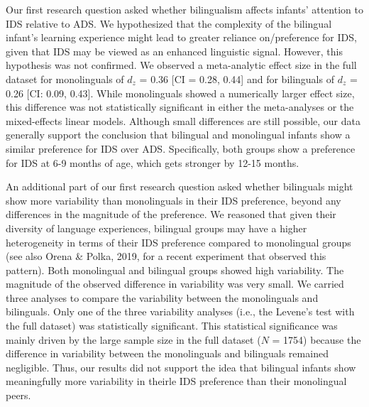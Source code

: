 \documentclass[,man,floatsintext]{apa6}
\begin{document}
Our first research question asked whether bilingualism affects infants' attention to IDS relative to ADS. We hypothesized that the complexity of the bilingual infant's learning experience might lead to greater reliance on/preference for IDS, given that IDS may be viewed as an enhanced linguistic signal. However, this hypothesis was not confirmed. We observed a meta-analytic effect size in the full dataset for monolinguals of \(d_z\) = 0.36 {[}CI = 0.28, 0.44{]} and for bilinguals of \(d_z\) = 0.26 {[}CI: 0.09, 0.43{]}. While monolinguals showed a numerically larger effect size, this difference was not statistically significant in either the meta-analyses or the mixed-effects linear models. Although small differences are still possible, our data generally support the conclusion that bilingual and monolingual infants show a similar preference for IDS over ADS. Specifically, both groups show a preference for IDS at 6-9 months of age, which gets stronger by 12-15 months.

An additional part of our first research question asked whether bilinguals might show more variability than monolinguals in their IDS preference, beyond any differences in the magnitude of the preference. We reasoned that given their diversity of language experiences, bilingual groups may have a higher heterogeneity in terms of their IDS preference compared to monolingual groups (see also Orena \& Polka, 2019, for a recent experiment that observed this pattern). Both monolingual and bilingual groups showed high variability. The magnitude of the observed difference in variability was very small. We carried three analyses to compare the variability between the monolinguals and bilinguals. Only one of the three variability analyses (i.e., the Levene's test with the full dataset) was statistically significant. This statistical significance was mainly driven by the large sample size in the full dataset (\(N\) = 1754) because the difference in variability between the monolinguals and bilinguals remained negligible. Thus, our results did not support the idea that bilingual infants show meaningfully more variability in theirle IDS preference than their monolingual peers.
\end{document}
